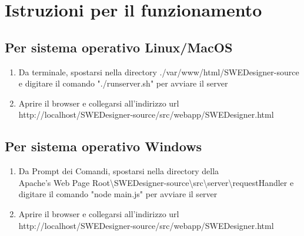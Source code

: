\documentclass[../ManualeUtente.tex]{subfiles}
\begin{document}
	\section{Istruzioni per il funzionamento}\label{sez:funcIstr}
		\subsection{Per sistema operativo Linux/MacOS}
		 	\begin{enumerate}
		 		\item Da terminale, spostarsi nella directory ./var/www/html/SWEDesigner-source e digitare il comando
		 		"./runserver.sh" per avviare il server
	 			\item Aprire il browser e collegarsi all'indirizzo url\\
	 			http://localhost/SWEDesigner-source/src/webapp/SWEDesigner.html
		 	\end{enumerate}
		\subsection{Per sistema operativo Windows}
			\begin{enumerate}
		 		\item Da Prompt dei Comandi, spostarsi nella directory della\\
		 		Apache's Web Page Root\textbackslash SWEDesigner-source\textbackslash src\textbackslash server\textbackslash requestHandler e digitare il comando "node main.js"
		 		per avviare il server
		 		\item Aprire il browser e collegarsi all'indirizzo url\\
		 		http://localhost/SWEDesigner-source/src/webapp/SWEDesigner.html
		 	\end{enumerate}
\end{document}
